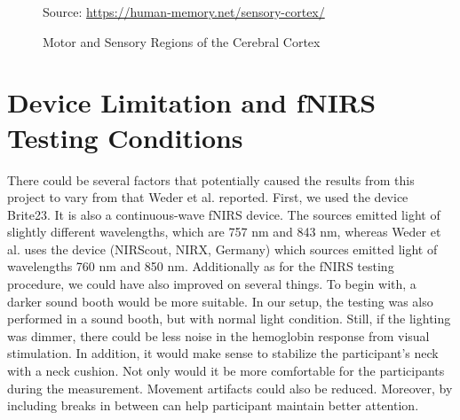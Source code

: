 \begin{figure}[H]
  \centering
           {Source: \url{https://human-memory.net/sensory-cortex/}}
  \caption{Motor and Sensory Regions of the Cerebral Cortex}
  \label{fig:CerebralCortex}
\end{figure}

\section{Device Limitation and fNIRS Testing Conditions}

There could be several factors that potentially caused the results from this project to vary from that Weder et al. \citeyear{Weder2018} reported. First, we used the device Brite23. It is also a continuous-wave fNIRS device. The sources emitted light of slightly different wavelengths, which are 757 nm and 843 nm, whereas Weder et al. \citeyear{Weder2018} uses the device (NIRScout, NIRX, Germany) which sources emitted light of wavelengths 760 nm and 850 nm. Additionally as for the fNIRS testing procedure, we could have also improved on several things. To begin with, a darker sound booth would be more suitable. In our setup, the testing was also performed in a sound booth, but with normal light condition. Still, if the lighting was dimmer, there could be less noise in the hemoglobin response from visual stimulation. In addition, it would make sense to stabilize the participant's neck with a neck cushion. Not only would it be more comfortable for the participants during the measurement. Movement artifacts could also be reduced. Moreover, by including breaks in between can help participant maintain better attention.

